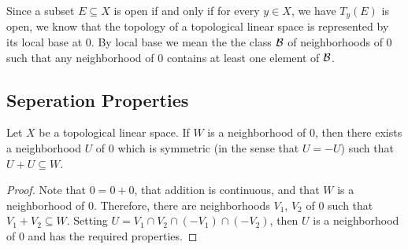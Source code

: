 Since a subset $E \subseteq X$ is open if and only if for every $y \in X$, 
we have $T_{y}(E)$ is open, we know that the topology of a topological 
linear space is represented by its local base at $0$. 
By local base we mean the the class $\mathcal{B}$ of neighborhoods of $0$ such that 
any neighborhood of $0$ contains at least one element of $\mathcal{B}$. 

\subsection{Seperation Properties}
\begin{lemma}
\label{lemma:topological_linear_spaces:seperation_lemma}
Let $X$ be a topological linear space. 
If $W$ is a neighborhood of $0$, then there exists a neighborhood $U$ of $0$ 
which is symmetric (in the sense that $U = -U$) such that $U + U \subseteq 
W$. 
\end{lemma}
\begin{proof}
Note that $0 = 0 + 0$, that addition is continuous, and that $W$ is a 
neighborhood of $0$. 
Therefore, there are neighborhoods $V_1$, $V_2$ of $0$ such that $V_1 + V_2
\subseteq W$. 
Setting $U = V_1 \cap V_2 \cap (-V_1) \cap (-V_2)$, then $U$ is a 
neighborhood of $0$ and has the required properties. 
\end{proof}

